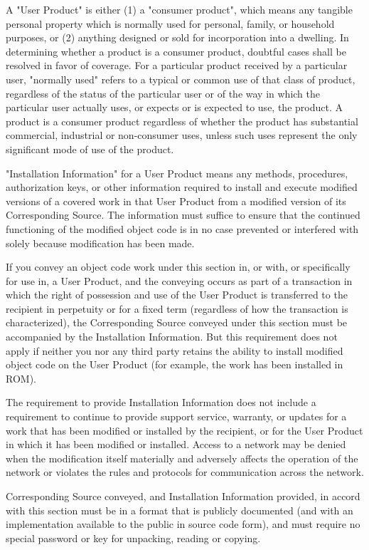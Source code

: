 A "{}\+User Product"{} is either (1) a "{}consumer product"{}, which means any tangible personal property which is normally used for personal, family, or household purposes, or (2) anything designed or sold for incorporation into a dwelling. In determining whether a product is a consumer product, doubtful cases shall be resolved in favor of coverage. For a particular product received by a particular user, "{}normally used"{} refers to a typical or common use of that class of product, regardless of the status of the particular user or of the way in which the particular user actually uses, or expects or is expected to use, the product. A product is a consumer product regardless of whether the product has substantial commercial, industrial or non-\/consumer uses, unless such uses represent the only significant mode of use of the product.

"{}\+Installation Information"{} for a User Product means any methods, procedures, authorization keys, or other information required to install and execute modified versions of a covered work in that User Product from a modified version of its Corresponding Source. The information must suffice to ensure that the continued functioning of the modified object code is in no case prevented or interfered with solely because modification has been made.

If you convey an object code work under this section in, or with, or specifically for use in, a User Product, and the conveying occurs as part of a transaction in which the right of possession and use of the User Product is transferred to the recipient in perpetuity or for a fixed term (regardless of how the transaction is characterized), the Corresponding Source conveyed under this section must be accompanied by the Installation Information. But this requirement does not apply if neither you nor any third party retains the ability to install modified object code on the User Product (for example, the work has been installed in ROM).

The requirement to provide Installation Information does not include a requirement to continue to provide support service, warranty, or updates for a work that has been modified or installed by the recipient, or for the User Product in which it has been modified or installed. Access to a network may be denied when the modification itself materially and adversely affects the operation of the network or violates the rules and protocols for communication across the network.

Corresponding Source conveyed, and Installation Information provided, in accord with this section must be in a format that is publicly documented (and with an implementation available to the public in source code form), and must require no special password or key for unpacking, reading or copying.



